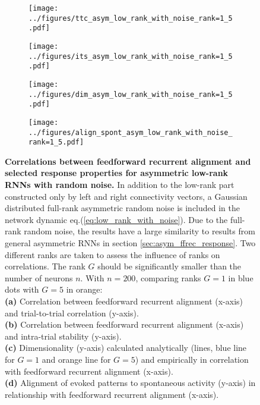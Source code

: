 \documentclass[11pt]{article}
\begin{document}
		\begin{figure}
			\centering
			\begin{subfigure}[b]{0.45\textwidth}
				\centering
				\texttt{[image: ../figures/ttc\_asym\_low\_rank\_with\_noise\_rank=1\_5.pdf]}
				\caption{}
			\end{subfigure}
			\hfill
			\begin{subfigure}[b]{0.45\textwidth}
				\centering
				\texttt{[image: ../figures/its\_asym\_low\_rank\_with\_noise\_rank=1\_5.pdf]}
				\caption{}
			\end{subfigure}
			\newline
			\begin{subfigure}[b]{0.44\textwidth}
				\centering
				\texttt{[image: ../figures/dim\_asym\_low\_rank\_with\_noise\_rank=1\_5.pdf]}
				\caption{}
			\end{subfigure}
			\hfill
			\begin{subfigure}[b]{0.45\textwidth}
				\centering
				\texttt{[image: ../figures/align\_spont\_asym\_low\_rank\_with\_noise\_rank=1\_5.pdf]}
				\caption{}
			\end{subfigure}
		\caption[Correlations between feedforward recurrent alignment and selected response properties for asymmetric low-rank RNNs with random noise]{\textbf{Correlations between feedforward recurrent alignment and selected response properties for asymmetric low-rank RNNs with random noise.} In addition to the low-rank part constructed only by left and right connectivity vectors, a Gaussian distributed full-rank asymmetric random noise is included in the network dynamic eq.(\ref{eq:low_rank_with_noise}). Due to the full-rank random noise, the results have a large similarity to results from general asymmetric RNNs in section \ref{sec:asym_ffrec_response}. Two different ranks are taken to assess the influence of ranks on correlations. The rank $G$ should be significantly smaller than the number of neurons $n$. 
		With $n = 200$, comparing ranks $G = 1$ in blue dots with $G=5$ in orange:\\
		\textbf{(a)} Correlation between feedforward recurrent alignment (x-axis) and trial-to-trial correlation (y-axis). \\
		\textbf{(b)} Correlation between feedforward recurrent alignment (x-axis) and intra-trial stability (y-axis). \\
		\textbf{(c)} Dimensionality (y-axis) calculated analytically (lines, blue line for $G=1$ and orange line for $G=5$) and empirically in correlation with feedforward recurrent alignment (x-axis).\\
		\textbf{(d)} Alignment of evoked patterns to spontaneous activity (y-axis) in relationship with feedforward recurrent alignment (x-axis).}
		\label{fig:result_asym_low_rank_with_noise}
		\end{figure}
 
\end{document}
